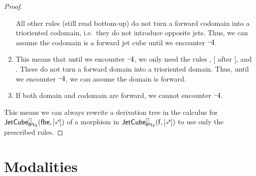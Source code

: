\documentclass[a4paper]{memoir}
\begin{document}
\begin{proof}
\begin{enumerate}
		All other rules (still read bottom-up) do not turn a forward codomain into a trioriented codomain, i.e.\ they do not introduce opposite jets.
		Thus, we can assume the codomain is a forward jet cube until we encounter $\lnot \mathbf{i}$.
		\item This means that until we encounter $\lnot \mathbf{i}$, we only need the rules , [ after ],  and .
		These do not turn a forward domain into a trioriented domain. Thus, until we encounter $\lnot \mathbf{i}$, we can assume the domain is forward.
		\item If both domain and codomain are forward, we cannot encounter $\lnot \mathbf{i}$.
	\end{enumerate}
	This means we can always rewrite a derivation tree in the calculus for $\jetcubetri \affine \bipointedsym {[\ypolar]}$ of a morphism in $\jetcubefwd \affine \bipointedsym {[\ypolar]}$ to use only the prescribed rules. 
\end{proof}

\chapter{Modalities}
\end{document}
